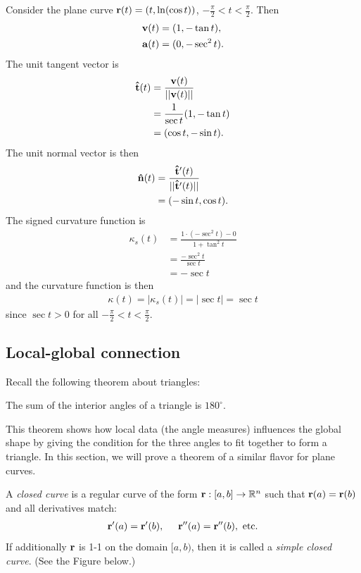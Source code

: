\documentclass[12pt,letterpaper,reqno]{article}
\numberwithin{equation}{section}
\newcommand{\R}{\ensuremath{\mathbb R}}
\newcommand{\bv}{{\bf v}}
\newcommand{\ba}{{\bf a}}
\newcommand{\bbr}{{\bf r}}
\newcommand{\ut}{{\bf {\hat{t}}}}
\newcommand{\un}{{\bf {\hat{n}}}}
\newcommand{\fixme}[1]{{\color{orange}{[#1]}}}
\begin{document}
{\begin{example}
Consider the plane curve $\bbr(t)=(t,\ln(\cos t))$, $-\frac{\pi}{2}<t<\frac{\pi}{2}$.
Then
\begin{align*}
	\bv(t)&=(1,-\tan t), \\
	\ba(t)&=(0,-\sec^2 t). \\
\end{align*}	
The unit tangent vector is
\begin{align*}
	\ut(t)&=\frac{\bv(t)}{||\bv(t)||} \\
	&=\frac{1}{\sec t}(1,-\tan t) \\
	&=(\cos t, -\sin t).
\end{align*}
The unit normal vector is then
\begin{align*}
	\un(t)&=\frac{\ut'(t)}{||\ut'(t)||} \\
	&=(-\sin t,\cos t).
\end{align*}
The signed curvature function is
\begin{align*}
	\kappa_s(t)&=\frac{1\cdot (-\sec ^2 t)-0}{1+\tan^2t} \\
	&=\frac{-\sec ^2 t}{\sec t} \\
	&=-\sec t
\end{align*}
and the curvature function is then
\begin{align*}
	\kappa(t)=|\kappa_s(t)|=|\sec t|=\sec t
\end{align*}
since $\sec t>0$ for all $-\frac{\pi}{2}<t<\frac{\pi}{2}$.
\end{example}

\subsection{Local-global connection}
\fixme{Decide what to do with this section.}
Recall the following theorem about triangles:

\begin{thm}
	The sum of the interior angles of a triangle is $180^\circ$.
\end{thm}

This theorem shows how local data (the angle measures) influences the global shape by giving the condition for the three angles to fit together to form a triangle. In this section, we will prove a theorem of a similar flavor for plane curves.

\begin{defn}
	A \emph{closed curve} is a regular curve of the form $\bbr:[a,b] \to \R^n$ such that $\bbr(a)=\bbr(b)$ and all derivatives match:
	\begin{align*}
		\bbr'(a)=\bbr'(b), \hspace{0.5cm} \bbr''(a)=\bbr''(b), \text{ etc.} 
	\end{align*}
	If additionally $\bbr$ is 1-1 on the domain $[a,b)$, then it is called a \emph{simple closed curve}. (See the Figure below.)
\end{defn}

}
\end{document}
